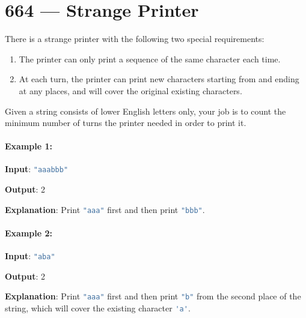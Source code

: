 \section{664 --- Strange Printer}
There is a strange printer with the following two special requirements:

\begin{enumerate}
\item The printer can only print a sequence of the same character each time.
\item At each turn, the printer can print new characters starting from and ending at any places, and will cover the original existing characters.
\end{enumerate}

Given a string consists of lower English letters only, your job is to count the minimum number of turns the printer needed in order to print it.

\paragraph{Example 1:}

\begin{flushleft}


\textbf{Input}:  \lstinline[language=C++, basicstyle=\small\ttfamily, keywordstyle=\bfseries\color{green!40!black}]|"aaabbb"|

\textbf{Output}: 2

\textbf{Explanation}: Print  \lstinline[language=C++, basicstyle=\small\ttfamily, keywordstyle=\bfseries\color{green!40!black}]|"aaa"| first and then print  \lstinline[language=C++, basicstyle=\small\ttfamily, keywordstyle=\bfseries\color{green!40!black}]|"bbb"|.

\end{flushleft}

\paragraph{Example 2:}

\begin{flushleft}

\textbf{Input}:  \lstinline[language=C++, basicstyle=\small\ttfamily, keywordstyle=\bfseries\color{green!40!black}]|"aba"|

\textbf{Output}: 2

\textbf{Explanation}: Print  \lstinline[language=C++, basicstyle=\small\ttfamily, keywordstyle=\bfseries\color{green!40!black}]|"aaa"| first and then print  \lstinline[language=C++, basicstyle=\small\ttfamily, keywordstyle=\bfseries\color{green!40!black}]|"b"| from the second place of the string, which will cover the existing character  \lstinline[language=C++, basicstyle=\small\ttfamily, keywordstyle=\bfseries\color{green!40!black}]|'a'|.

\end{flushleft}


